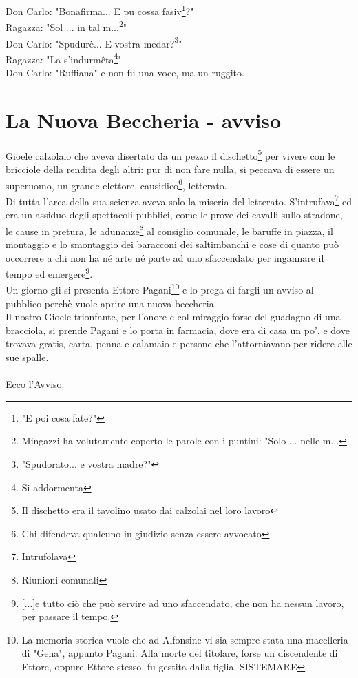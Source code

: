 \documentclass[10pt]{memoir} %
\begin{document}
Don Carlo: "Bonafirma... E pu cossa fasiv\footnote{"E poi cosa fate?"}?"\\
Ragazza: "Sol ... in tal m...\footnote{Mingazzi ha volutamente coperto le parole con i puntini: "Solo ... nelle m...}"\\
Don Carlo: "Spudurè... E vostra medar?\footnote{"Spudorato... e vostra madre?"}"\\
Ragazza: "La s'indurmêta\footnote{Si addormenta}"\\
Don Carlo: "Ruffiana" e non fu una voce, ma un ruggito.\\



\chapter{La Nuova Beccheria - avviso}
Gioele calzolaio che aveva disertato da un pezzo il dischetto\footnote{Il dischetto era il tavolino usato dai calzolai nel loro lavoro} per vivere con le bricciole della rendita degli altri: pur di non fare nulla, si peccava di essere un superuomo, un grande elettore, causidico\footnote{Chi difendeva qualcuno in giudizio senza essere avvocato}, letterato.\\
Di tutta l'arca della sua scienza aveva solo la miseria del letterato. S'intrufava\footnote{Intrufolava} ed era un assiduo degli spettacoli pubblici, come le prove dei cavalli sullo stradone, le cause in pretura, le adunanze\footnote{Riunioni comunali} al consiglio comunale, le baruffe in piazza, il montaggio e lo smontaggio dei baracconi dei saltimbanchi e cose di quanto può occorrere a chi non ha né arte né parte ad uno sfaccendato per ingannare il tempo ed emergere\footnote{[...]e tutto ciò che può servire ad uno sfaccendato, che non ha nessun lavoro, per passare il tempo.}.\\
Un giorno gli si presenta Ettore Pagani\footnote{La memoria storica vuole che ad Alfonsine vi sia sempre stata una macelleria di "Gena", appunto Pagani. Alla morte del titolare, forse un discendente di Ettore, oppure Ettore stesso, fu gestita dalla figlia. SISTEMARE} e lo prega di fargli un avviso al pubblico perchè vuole aprire una nuova beccheria. \\
Il nostro Gioele trionfante, per l'onore e col miraggio forse del guadagno di una bracciola, si prende Pagani e lo porta in farmacia, dove era di casa un po', e dove trovava gratis, carta, penna e calamaio e persone che l'attorniavano per ridere alle sue spalle.\\
\\
Ecco l'Avviso:
\end{document}
